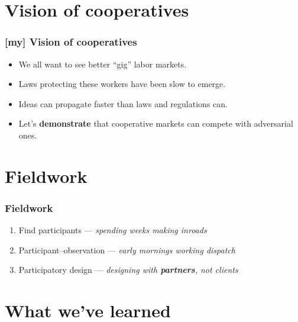 \documentclass{beamer}
\begin{document}
\section[Vision]{Vision of cooperatives}
\begin{frame}
\frametitle{[my] Vision of cooperatives}
\begin{itemize}
\item
We all want to see better ``gig'' labor markets.
\item 
Laws protecting these workers have been slow to emerge.
\item
Ideas can propagate faster than laws and regulations can.
\item
Let's \textbf{demonstrate} that cooperative markets can compete with adversarial ones.
\end{itemize}
\end{frame}

\section[Fieldwork]{Fieldwork}
\begin{frame}
\frametitle{Fieldwork}
\begin{enumerate}
\item
Find participants --- \textit{spending weeks making inroads}
\item
Participant--observation --- \textit{early mornings working dispatch}
\item
Participatory design --- \textit{designing with \textbf{partners}, not clients}
\end{enumerate}

\end{frame}

\section[Lessons]{What we've learned}
\end{document}
